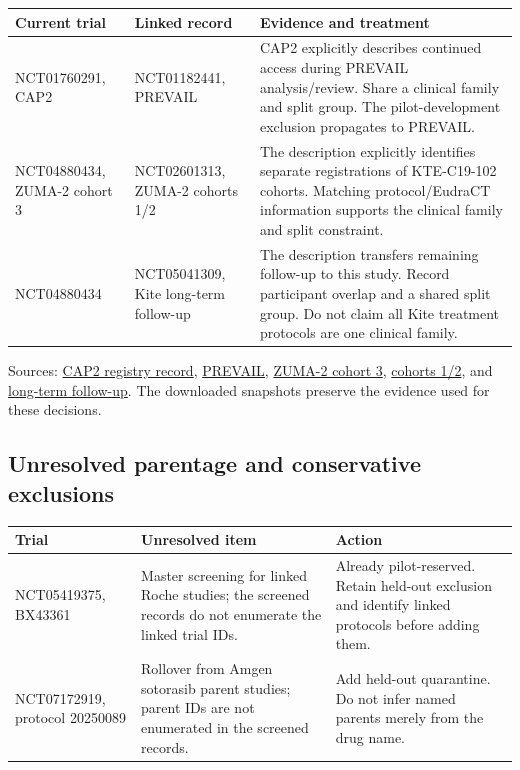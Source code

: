 \documentclass[10pt,letterpaper]{article}
\begin{document}
\begin{longtable}{L{.20\linewidth}L{.34\linewidth}L{.34\linewidth}}
\toprule\noalign{}
Current trial & Linked record & Evidence and treatment \\
\midrule\noalign{}
\endhead
\bottomrule\noalign{}
\endlastfoot
NCT01760291, CAP2 & NCT01182441, PREVAIL & CAP2 explicitly describes continued access during PREVAIL analysis/review. Share a clinical family and split group. The pilot-development exclusion propagates to PREVAIL. \\
NCT04880434, ZUMA-2 cohort 3 & NCT02601313, ZUMA-2 cohorts 1/2 & The description explicitly identifies separate registrations of KTE-C19-102 cohorts. Matching protocol/EudraCT information supports the clinical family and split constraint. \\
NCT04880434 & NCT05041309, Kite long-term follow-up & The description transfers remaining follow-up to this study. Record participant overlap and a shared split group. Do not claim all Kite treatment protocols are one clinical family. \\
\end{longtable}

Sources: \href{https://clinicaltrials.gov/api/v2/studies/NCT01760291}{CAP2 registry record}, \href{https://clinicaltrials.gov/api/v2/studies/NCT01182441}{PREVAIL}, \href{https://clinicaltrials.gov/api/v2/studies/NCT04880434}{ZUMA-2 cohort 3}, \href{https://clinicaltrials.gov/api/v2/studies/NCT02601313}{cohorts 1/2}, and \href{https://clinicaltrials.gov/api/v2/studies/NCT05041309}{long-term follow-up}. The downloaded snapshots preserve the evidence used for these decisions.

\subsection{Unresolved parentage and conservative exclusions}\label{audit-unresolved-parentage-and-conservative-exclusions}

\begin{longtable}{L{.20\linewidth}L{.34\linewidth}L{.34\linewidth}}
\toprule\noalign{}
Trial & Unresolved item & Action \\
\midrule\noalign{}
\endhead
\bottomrule\noalign{}
\endlastfoot
NCT05419375, BX43361 & Master screening for linked Roche studies; the screened records do not enumerate the linked trial IDs. & Already pilot-reserved. Retain held-out exclusion and identify linked protocols before adding them. \\
NCT07172919, protocol 20250089 & Rollover from Amgen sotorasib parent studies; parent IDs are not enumerated in the screened records. & Add held-out quarantine. Do not infer named parents merely from the drug name. \\
\end{longtable}
\end{document}
